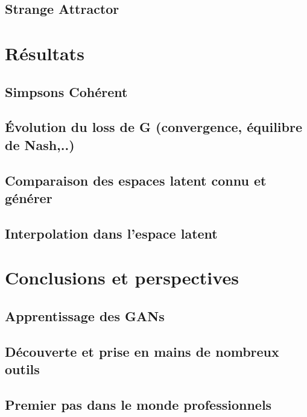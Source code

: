 \documentclass[11pt]{article}
\begin{document}
\subsection{Strange Attractor}

\section{Résultats}

\subsection{Simpsons Cohérent}
\subsection{Évolution du loss de G (convergence, équilibre de Nash,..)}
\subsection{Comparaison des espaces latent connu et générer}
\subsection{Interpolation dans l'espace latent}

\section{Conclusions et perspectives}

\subsection{Apprentissage des GANs}
\subsection{Découverte et prise en mains de nombreux outils}
\subsection{Premier pas dans le monde professionnels}

\newpage
\end{document}
